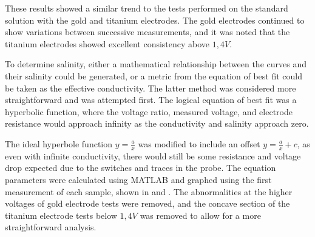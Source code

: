 These results showed a similar trend to the tests performed on the standard solution with the gold and titanium electrodes.
The gold electrodes continued to show variations between successive measurements, and it was noted that the titanium electrodes showed excellent consistency above $1,4V$.

To determine salinity, either a mathematical relationship between the curves and their salinity could be generated, or a metric from the equation of best fit could be taken as the effective conductivity.
The latter method was considered more straightforward and was attempted first.
The logical equation of best fit was a hyperbolic function, where the voltage ratio, measured voltage, and electrode resistance would approach infinity as the conductivity and salinity approach zero. 

The ideal hyperbole function $y = \frac{a}{x}$ was modified to include an offset $y = \frac{a}{x} + c$, as even with infinite conductivity, there would still be some resistance and voltage drop expected due to the switches and traces in the probe.
The equation parameters were calculated using MATLAB and graphed using the first measurement of each sample, shown in  and .
The abnormalities at the higher voltages of gold electrode tests were removed, and the concave section of the titanium electrode tests below $1,4V$ was removed to allow for a more straightforward analysis.

